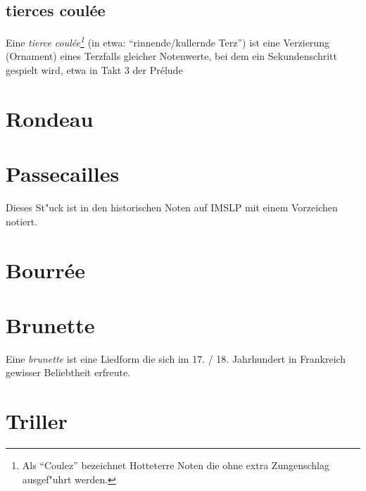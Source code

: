\documentclass{notes}
\begin{document}
\begin{center}
\end{center}
\subsection{tierces coulée}
Eine \textit{tierce coulée\footnote{Als \enquote{Coulez} bezeichnet Hotteterre Noten die ohne extra Zungenschlag ausgef"uhrt werden.}} (in etwa: \enquote{rinnende/kullernde Terz}) ist
eine Verzierung (Ornament) eines Terzfalls gleicher Notenwerte, bei dem ein
Sekundenschritt gespielt wird, etwa in Takt 3 der Pr\'{e}lude
\begin{center}
\end{center}
\section{Rondeau}
\section{Passecailles}
Dieses St"uck ist in den historischen Noten auf IMSLP mit einem Vorzeichen notiert.
\section{Bourrée}
\section{Brunette}
Eine \textit{brunette} ist eine Liedform die sich im 17. / 18. Jahrhundert in
Frankreich gewisser Beliebtheit erfreute.
\appendix
\section{Triller}
\end{document}
